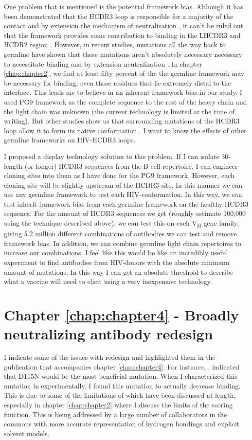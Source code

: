 One problem that is mentioned is the potential framework bias. Although it has been demonstrated that the HCDR3 loop is responsible for a majority of the contact and by extension the mechanism of neutralization \citep{Pejchal:2010fp,Pancera:2010hh}, it can't be ruled out that the framework provides some contribution to binding in the LHCDR3 and HCDR2 region \citep{McLellan:2011dg}. However, in recent studies, mutations all the way back to germline have shown that these mutations aren't absolutely necessary necessary to necessitate binding and by extension neutralization \citep{Klein:2013iz}. In chapter \ref{chap:chapter2}, we find at least fifty percent of the the germline framework may be necessary for binding, even those residues that lie extremely distal to the interface. This leads me to believe in an inherent framework bias in our study. I used PG9 framework as the complete sequence to the rest of the heavy chain and the light chain was unknown (the current technology is limited at the time of writing). But other studies show us that surrounding mutations of the HCDR3 loop allow it to form its native conformation \citep{Wong:2011ff}. I want to know the effects of other germline frameworks on HIV-\naive HCDR3 loops.

I proposed a display technology solution to this problem. If I can isolate 30-length (or longer) HCDR3 sequences from the B cell repertoire, I can engineer cloning sites into them as I have done for the PG9 framework. However, each cloning site will be slightly upstream of the HCDR3 site. In this manner we can use any germline framework to test each HIV-\naive conformation. In this way, we can test inherit framework bias from each germline framework on the healthy HCDR3 sequence. For the amount of HCDR3 sequences we get (roughly estimate 100,000 using the technique described above), we can test this on each V\textsubscript{H} gene family, giving 5.2 million different combinations of antibodies we can test and remove framework bias. In addition, we can combine germline light chain repertoires to increase our combinations. I feel like this would be like an incredibly useful experiment to find antibodies from HIV-\naive donors with the absolute minimum amount of mutations. In this way I can get an absolute threshold to describe what a vaccine will need to elicit using a very inexpensive technology.

\section{Chapter \ref{chap:chapter4} - Broadly neutralizing antibody redesign}
I indicate some of the issues with redesign and highlighted them in the publication that accompanies chapter \ref{chap:chapter4}. For instance, \rosettadesign, indicated that D115N would be the most beneficial mutation. When I characterized this mutation in experimentally, I found this mutation to actually decrease binding. This is due to some of the limitations of \rosetta which have been discussed at length, especially in chapter \ref{chap:chapter2} where I discuss the limits of the \rosetta scoring function. This is being addressed by a large number of \rosetta collaborators in the commons with more accurate representation of hydrogen bondings and explicit solvent models.

